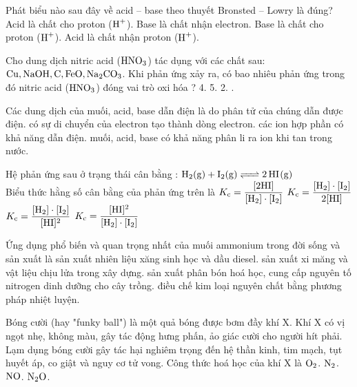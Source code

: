 \documentclass[11pt,a4paper]{article}
\begin{document}
\begin{ex}%
Phát biểu nào sau đây về acid – base theo thuyết Bronsted – Lowry là đúng?
\choice
{\True Acid là chất cho proton ($\ce{H+}$).}
{Base là chất nhận electron.}
{Base là chất cho proton ($\ce{H+}$).}
{Acid là chất nhận proton ($\ce{H+}$).}

\end{ex}

\begin{ex}%
Cho dung dịch nitric acid ($\ce{HNO3}$) tác dụng với các chất sau: $\ce{Cu, NaOH, C, FeO, Na2CO3}$. Khi phản ứng xảy ra, có bao nhiêu phản ứng trong đó nitric acid ($\ce{HNO3}$) đóng vai trò oxi hóa ?
\choice
{4.}
{5.}
{2.}
{.}

\end{ex}

\begin{ex}%
Các dung dịch của muối, acid, base dẫn điện là do
\choice
{phân tử của chúng dẫn được điện.}
{có sự di chuyển của electron tạo thành dòng electron.}
{các ion hợp phần có khả năng dẫn điện.}
{\True muối, acid, base có khả năng phân li ra ion khi tan trong nước.}

\end{ex}

\begin{ex}%
Hệ phản ứng sau ở trạng thái cân bằng : $\ce{H2(g) + I2(g) <=> 2HI(g)}$\\
Biểu thức hằng số cân bằng của phản ứng trên là
\choice
{$K_\text{c} = \dfrac{[2\ce{HI}]}{[\ce{H2}]\cdot[\ce{I2}]}$}
{$K_\text{c} = \dfrac{[\ce{H2}]\cdot[\ce{I2}]}{2[\ce{HI}]}$}
{$K_\text{c} = \dfrac{[\ce{H2}]\cdot[\ce{I2}]}{[\ce{HI}]^2}$}
{\True $K_\text{c} = \dfrac{[\ce{HI}]^2}{[\ce{H2}]\cdot[\ce{I2}]}$}

\end{ex}

\begin{ex}%
Ứng dụng phổ biến và quan trọng nhất của muối ammonium trong đời sống và sản xuất là
\choice
{sản xuất nhiên liệu xăng sinh học và dầu diesel.}
{sản xuất xi măng và vật liệu chịu lửa trong xây dựng.}
{\True sản xuất phân bón hoá học, cung cấp nguyên tố nitrogen dinh dưỡng cho cây trồng.}
{điều chế kim loại nguyên chất bằng phương pháp nhiệt luyện.}

\end{ex}

\begin{ex}%
Bóng cười (hay "funky ball") là một quả bóng được bơm đầy khí X. Khí X có vị ngọt nhẹ, không màu, gây tác động hưng phấn, ảo giác cười cho người hít phải. Lạm dụng bóng cười gây tác hại nghiêm trọng đến hệ thần kinh, tim mạch, tụt huyết áp, co giật và nguy cơ tử vong. Công thức hoá học của khí X là
\choice
{$\ce{O2}$.}
{$\ce{N2}$.}
{$\ce{NO}$.}
{\True $\ce{N2O}$.}

\end{ex}
\end{document}

